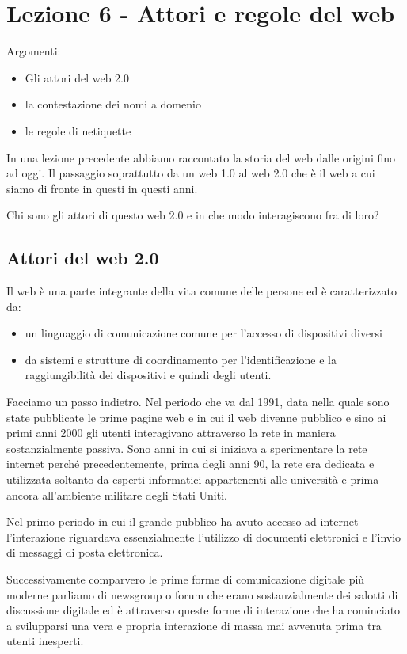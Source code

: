 \chapter{Lezione 6 - Attori e regole del web}

Argomenti:

\begin{itemize}
    \item Gli attori del web 2.0
    \item la contestazione dei nomi a domenio
    \item le regole di netiquette
\end{itemize}

In una lezione precedente abbiamo raccontato la storia del web dalle origini fino ad oggi. Il passaggio soprattutto da un web 1.0 al web 2.0 che è il web a cui siamo di fronte in questi in questi anni.

Chi sono gli attori di questo web 2.0 e in che modo interagiscono fra di loro?
\section{Attori del web 2.0}

Il web è una parte integrante della vita comune delle persone ed è caratterizzato da:

\begin{itemize}
    \item un linguaggio di comunicazione comune per l'accesso di dispositivi diversi
    \item da sistemi e strutture di coordinamento per l'identificazione e la raggiungibilità dei dispositivi e quindi degli utenti.
\end{itemize}

Facciamo un passo indietro. Nel periodo che va dal 1991, data nella quale sono state pubblicate le prime pagine web e in cui il web divenne pubblico e sino ai primi anni 2000 gli utenti interagivano attraverso la rete in maniera sostanzialmente passiva. Sono anni in cui si iniziava a sperimentare la rete internet perché precedentemente, prima degli anni 90, la rete era dedicata e utilizzata soltanto da esperti informatici appartenenti alle università e prima ancora all'ambiente militare degli Stati Uniti.

Nel primo periodo in cui il grande pubblico ha avuto accesso ad internet l'interazione riguardava essenzialmente l'utilizzo di documenti elettronici e l'invio di messaggi di posta elettronica.

Successivamente comparvero le prime forme di comunicazione digitale più moderne parliamo di newsgroup o forum che erano sostanzialmente dei salotti di discussione digitale ed è attraverso queste forme di interazione che ha cominciato a svilupparsi una vera e propria interazione di massa mai avvenuta prima tra utenti inesperti.

